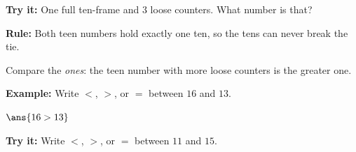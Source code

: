 \documentclass[12pt]{article}
\begin{document}
\begin{tryitbox}
\textbf{Try it:} \quad One full ten-frame and $3$ loose counters. What number is that?\\[2pt]
\end{tryitbox}


\begin{formulabox}
\textbf{Rule:} Both teen numbers hold exactly one ten, so the tens can never break the tie.\par
Compare the \emph{ones}: the teen number with more loose counters is the greater one.
\end{formulabox}

\begin{examplebox}
\textbf{Example:} \quad Write $<$, $>$, or $=$ between $16$ and $13$.

$\ans{16 > 13}$
\end{examplebox}

\begin{tryitbox}
\textbf{Try it:} \quad Write $<$, $>$, or $=$ between $11$ and $15$.\\[2pt]
\end{tryitbox}
\end{document}
